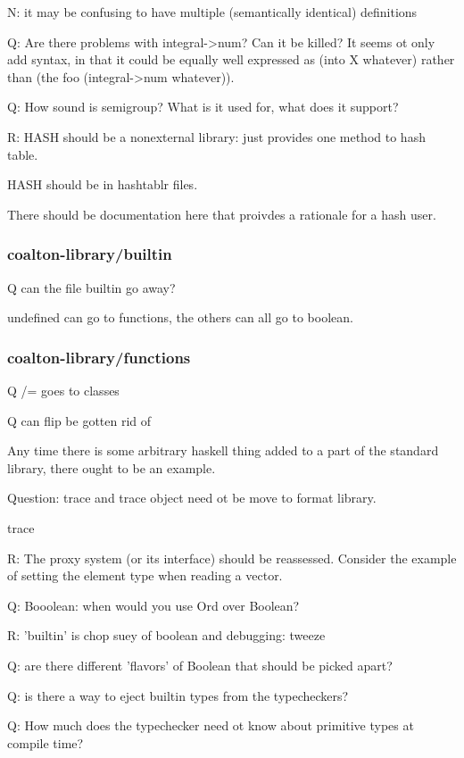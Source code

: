 \documentclass[12pt]{article}
\begin{document}
N: it may be confusing to have multiple (semantically identical)
definitions

Q: Are there problems with integral->num? Can it be killed? It seems
ot only add syntax, in that it could be equally well expressed as
(into X whatever) rather than (the foo (integral->num whatever)).

Q: How sound is semigroup? What is it used for, what does it support?

R: HASH should be a nonexternal library: just provides one method to hash table.

HASH should be in hashtablr files.

There should be documentation here that proivdes a rationale for a hash user.

\subsubsection{coalton-library/builtin}

Q can the file builtin go away?

undefined can go to functions, the others can all go to boolean.

\subsubsection{coalton-library/functions}

Q /= goes to classes

Q can flip be gotten rid of

Any time there is some arbitrary haskell thing added to a part of the
standard library, there ought to be an example.

Question: trace and trace object need ot be move to format library.

trace

R: The proxy system (or its interface) should be reassessed. Consider
the example of setting the element type when reading a vector.

Q: Booolean: when would you use Ord over Boolean?

R: 'builtin' is chop suey of boolean and debugging: tweeze

Q: are there different 'flavors' of Boolean that should be picked apart?

Q: is there a way to eject builtin types from the typecheckers?

Q:  How much does the typechecker need ot know about primitive types at compile time?
\end{document}

